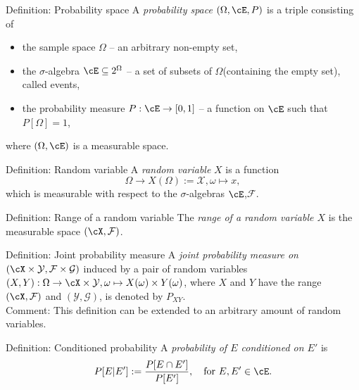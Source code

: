 \documentclass[
			print,
			a6paper,
			grid=none]{kartei}
\begin{document}
\begin{karte}{Definition: Probability space}
	A \emph{probability space} $(\Omega, \cE, P)$ is a triple consisting of 
	\begin{itemize}
		\item the sample space $\Omega$ -- an arbitrary non-empty set,
		\item the $\sigma$-algebra $\cE \subseteq 2^{\Omega}$ -- a set of subsets of $\Omega$(containing the empty set), called events,
		\item the probability measure $P: \cE\to [0,1]$ -- a function on $\cE$ such that $P[\Omega]=1$,
	\end{itemize}
	where $(\Omega, \cE)$ is a measurable space.
\end{karte}

\begin{karte}{Definition: Random variable}
	A \emph{random variable} $X$ is a function 
	\begin{equation*}
		\Omega \to X(\Omega):=\mathcal{X}, \omega\mapsto x,
	\end{equation*}
	which is measurable with respect to the $\sigma$-algebras $\cE$,$\mathcal{F}$.
\end{karte}

\begin{karte}{Definition: Range of a random variable}
	The \emph{range of a random variable $X$} is the measurable space $(\cX,\mathcal{F})$.
\end{karte}

\begin{karte}{Definition: Joint probability measure}
	A \emph{joint probability measure on $(\cX\times\mathcal{Y},\mathcal{F}\times\mathcal{G})$} induced by a pair of random variables $(X,Y):\Omega\to\cX\times\mathcal{Y},\omega\mapsto X(\omega)\times Y(\omega)$, where $X$ and $Y$ have the range $(\cX,\mathcal{F})$ and $(\mathcal{Y},\mathcal{G})$, is denoted by $P_{XY}$. \\ Comment: This definition can be extended to an arbitrary amount of random variables.
\end{karte}

\begin{karte}{Definition: Conditioned probability}
	A \emph{probability of $E$ conditioned on $E'$} is 
	\begin{equation*}
		P[E\vert E']:=\frac{P[E\cap E']}{P[E']},\quad \textrm{for } E,E'\in\cE.
	\end{equation*}
\end{karte}
\end{document}
